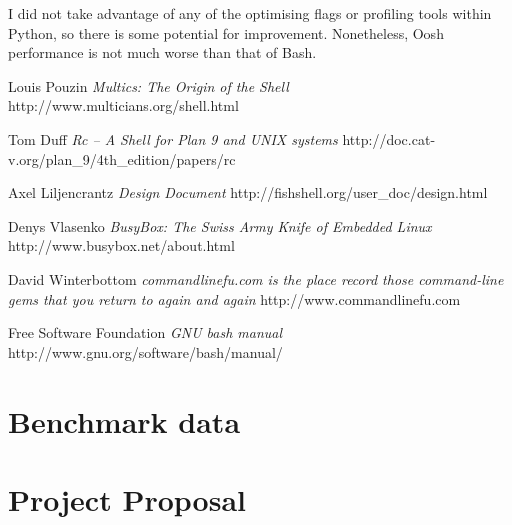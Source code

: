 \documentclass[12pt,twoside,notitlepage]{report}
\begin{document}

I did not take advantage of any of the optimising flags or profiling
tools within Python, so there is some potential for
improvement. Nonetheless, Oosh performance is not much worse than that
of Bash.

\cleardoublepage


\begin{thebibliography}{8} %

  Louis Pouzin
  \emph{Multics: The Origin of the Shell}
  http://www.multicians.org/shell.html

  Tom Duff
  \emph{Rc -- A Shell for Plan 9 and UNIX systems}
  http://doc.cat-v.org/plan\_9/4th\_edition/papers/rc

  Axel Liljencrantz
  \emph{Design Document}
  http://fishshell.org/user\_doc/design.html

  Denys Vlasenko
  \emph{BusyBox: The Swiss Army Knife of Embedded Linux}
  http://www.busybox.net/about.html

  David Winterbottom
  \emph{commandlinefu.com is the place record those command-line gems that
  you return to again and again}
  http://www.commandlinefu.com

  Free Software Foundation
  \emph{GNU bash manual}
  http://www.gnu.org/software/bash/manual/

\end{thebibliography}
\cleardoublepage

\appendix

\chapter{Benchmark data}

\chapter{Project Proposal}
\parindent 0pt
\parskip 6pt

\end{document}
